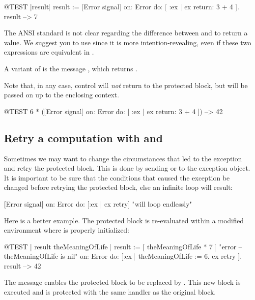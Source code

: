 \documentclass[a4paper,10pt,twoside]{book}
\begin{document}
\begin{code}{@TEST |result|}
result := [Error signal]
	on: Error
	do: [ :ex | ex return: 3 + 4 ].
result --> 7
\end{code}

The ANSI standard is not clear regarding the difference between  and  to return a value. We suggest you to use  since it is more intention-revealing, even if these two expressions are equivalent in \pharo.

A variant of  is the message , which returns . 

Note that, in any case, control will \emph{not} return to the protected block, but will be passed on up to the enclosing context.

\begin{code}{@TEST}
6 * ([Error signal] on: Error do: [ :ex | ex return: 3 + 4 ]) --> 42
\end{code}

\subsection{Retry a computation with  and }

Sometimes we may want to change the circumstances that led to the exception and retry the protected block. This is done by sending  or  to the exception object. It is important to be sure that the conditions that caused the exception be changed before retrying the protected block, else an infinite  loop will result:
\begin{code}{}
[Error signal] on: Error do: [:ex | ex retry]    "will loop endlessly"
\end{code}

Here is a better example.
The protected block is re-evaluated within a modified environment where  is properly initialized:
\begin{code}{@TEST | result theMeaningOfLife |}
result := [ theMeaningOfLife * 7 ]    "error -- theMeaningOfLife is nil"
	on: Error
	do: [:ex | theMeaningOfLife := 6. ex retry ].
result --> 42
\end{code}

The message  enables the protected block to be replaced by . This new block is executed and is protected with the same handler as the original block.
\end{document}
